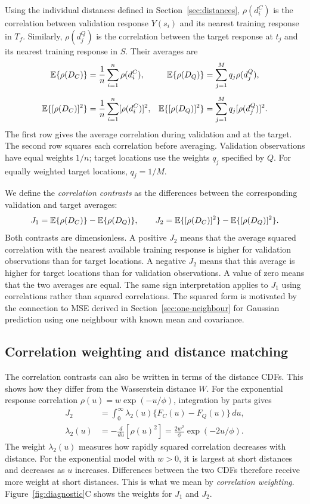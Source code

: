Using the individual distances defined in Section~\ref{sec:distances}, $\rho(d_i^C)$ is the correlation between validation response $Y(s_i)$ and its nearest training response in $T_f$. Similarly, $\rho(d_j^Q)$ is the correlation between the target response at $t_j$ and its nearest training response in $S$. Their averages are
\[
\begin{aligned}
 \mathbb{E}\{\rho(D_C)\}&=\frac{1}{n}\sum_{i=1}^n \rho(d_i^C),
 &\mathbb{E}\{\rho(D_Q)\}&=\sum_{j=1}^M q_j \rho(d_j^Q),\\[4pt]
 \mathbb{E}\{[\rho(D_C)]^2\}&=\frac{1}{n}\sum_{i=1}^n [\rho(d_i^C)]^2,
 &\mathbb{E}\{[\rho(D_Q)]^2\}&=\sum_{j=1}^M q_j[\rho(d_j^Q)]^2.
\end{aligned}
\]
The first row gives the average correlation during validation and at the target. The second row squares each correlation before averaging. Validation observations have equal weights $1/n$; target locations use the weights $q_j$ specified by $Q$. For equally weighted target locations, $q_j=1/M$.

We define the \emph{correlation contrasts} as the differences between the corresponding validation and target averages:
\begin{equation}
 J_1=\mathbb{E}\{\rho(D_C)\}-\mathbb{E}\{\rho(D_Q)\},\qquad
 J_2=\mathbb{E}\{[\rho(D_C)]^2\}-\mathbb{E}\{[\rho(D_Q)]^2\}.\label{eq:indices}
\end{equation}
Both contrasts are dimensionless. A positive $J_2$ means that the average squared correlation with the nearest available training response is higher for validation observations than for target locations. A negative $J_2$ means that this average is higher for target locations than for validation observations. A value of zero means that the two averages are equal. The same sign interpretation applies to $J_1$ using correlations rather than squared correlations. The squared form is motivated by the connection to MSE derived in Section~\ref{sec:one-neighbour} for Gaussian prediction using one neighbour with known mean and covariance.

\subsection{Correlation weighting and distance matching}
The correlation contrasts can also be written in terms of the distance CDFs. This shows how they differ from the Wasserstein distance $W$. For the exponential response correlation $\rho(u)=w\exp(-u/\phi)$, integration by parts gives
\begin{equation}
\begin{aligned}
 J_2&=\int_0^\infty\lambda_2(u)\{F_C(u)-F_Q(u)\}\,du,\\
 \lambda_2(u)&=-\frac{d}{du}[\rho(u)^2]
 =\frac{2w^2}{\phi}\exp(-2u/\phi).
\end{aligned}
\label{eq:weighting}
\end{equation}
The weight $\lambda_2(u)$ measures how rapidly squared correlation decreases with distance. For the exponential model with $w>0$, it is largest at short distances and decreases as $u$ increases. Differences between the two CDFs therefore receive more weight at short distances. This is what we mean by \emph{correlation weighting}. Figure~\ref{fig:diagnostic}C shows the weights for $J_1$ and $J_2$.

